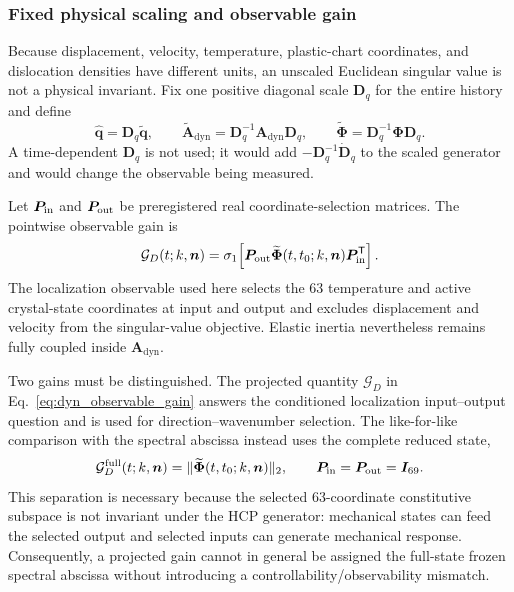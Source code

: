 \subsubsection{Fixed physical scaling and observable gain}

Because displacement, velocity, temperature, plastic-chart coordinates, and
dislocation densities have different units, an unscaled Euclidean singular
value is not a physical invariant.  Fix one positive diagonal scale
$\boldsymbol D_q$ for the entire history and define
\begin{equation}
 \widehat{\boldsymbol q}=\boldsymbol D_q\widetilde{\boldsymbol q},
 \qquad
 \widetilde{\boldsymbol A}_{\mathrm{dyn}}
 =\boldsymbol D_q^{-1}\boldsymbol A_{\mathrm{dyn}}\boldsymbol D_q,
 \qquad
 \widetilde{\boldsymbol\Phi}
 =\boldsymbol D_q^{-1}\boldsymbol\Phi\boldsymbol D_q.
 \label{eq:dyn_scaled_generator}
\end{equation}
A time-dependent $\boldsymbol D_q$ is not used; it would add
$-\boldsymbol D_q^{-1}\dot{\boldsymbol D}_q$ to the scaled generator and
would change the observable being measured.

Let $\boldsymbol P_{\rm in}$ and $\boldsymbol P_{\rm out}$ be preregistered
real coordinate-selection matrices.  The pointwise observable gain is
\begin{equation}
 \mathcal G_{D}(t;k,\boldsymbol n)
 =\sigma_1\!\left[
   \boldsymbol P_{\rm out}\widetilde{\boldsymbol\Phi}
   (t,t_0;k,\boldsymbol n)\boldsymbol P_{\rm in}^{\mathsf T}
  \right].
 \label{eq:dyn_observable_gain}
\end{equation}
The localization observable used here selects the 63 temperature and active
crystal-state coordinates at input and output and excludes displacement and
velocity from the singular-value objective.  Elastic inertia nevertheless
remains fully coupled inside $\boldsymbol A_{\mathrm{dyn}}$.

Two gains must be distinguished. The projected quantity
$\mathcal G_D$ in Eq.~\eqref{eq:dyn_observable_gain} answers the conditioned
localization input--output question and is used for direction--wavenumber
selection. The like-for-like comparison with the spectral abscissa instead
uses the complete reduced state,
\begin{equation}
 \mathcal G_D^{\rm full}(t;k,\boldsymbol n)
 =\|\widetilde{\boldsymbol\Phi}(t,t_0;k,\boldsymbol n)\|_2,
 \qquad
 \boldsymbol P_{\rm in}=\boldsymbol P_{\rm out}=\boldsymbol I_{69}.
 \label{eq:dyn_full_state_gain}
\end{equation}
This separation is necessary because the selected 63-coordinate constitutive
subspace is not invariant under the HCP generator: mechanical states can feed
the selected output and selected inputs can generate mechanical response.
Consequently, a projected gain cannot in general be assigned the full-state
frozen spectral abscissa without introducing a controllability/observability
mismatch.

